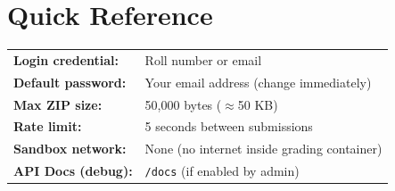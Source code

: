 \documentclass[12pt,a4paper]{article}
\begin{document}
\section{Quick Reference}

\begin{tcolorbox}[colback=eyantraBlue!5, colframe=eyantraBlue, title={\faBookmark\enspace Student Quick Reference}]
\begin{tabular}{ll}
\textbf{Login credential:}   & Roll number or email \\
\textbf{Default password:}   & Your email address (change immediately) \\
\textbf{Max ZIP size:}        & 50,000 bytes ($\approx$50 KB) \\
\textbf{Rate limit:}          & 5 seconds between submissions \\
\textbf{Sandbox network:}    & None (no internet inside grading container) \\
\textbf{API Docs (debug):}   & \texttt{/docs} (if enabled by admin) \\
\end{tabular}
\end{tcolorbox}

\end{document}
